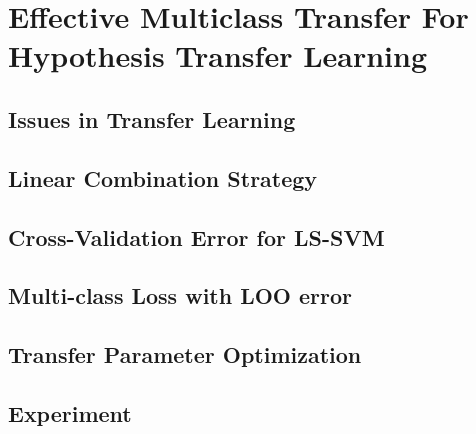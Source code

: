\chapter{Effective Multiclass Transfer For Hypothesis Transfer Learning}

\section{Issues in Transfer Learning} 

%
\section{Linear Combination Strategy}\label{sec:single:comb}

\section{Cross-Validation Error for LS-SVM}

\section{Multi-class Loss with LOO error}

\section{Transfer Parameter Optimization}

\section{Experiment}
